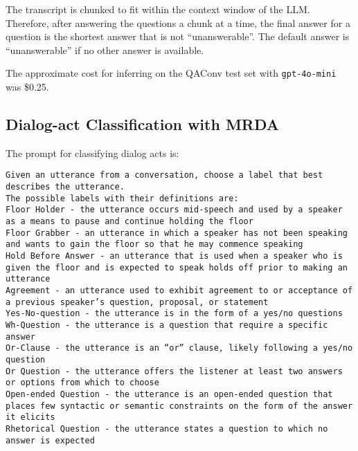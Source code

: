 The transcript is chunked to fit within the context window of the LLM. Therefore, after answering the questions a chunk at a time, the final answer for a question is the shortest answer that is not ``unanswerable''. The default answer is ``unanswerable'' if no other answer is available.

The approximate cost for inferring on the QAConv test set with \texttt{gpt-4o-mini} was \$0.25.


\subsection{Dialog-act Classification with MRDA}
\label{sec_appendix_prompts_mrda}

The prompt for classifying dialog acts is:

\begin{tcolorbox}[colback=gray!10, colframe=gray!50, sharp corners, boxrule=0.5mm]
\small{
\texttt{Given an utterance from a conversation, choose a label that best describes the utterance.\\
The possible labels with their definitions are:\\
Floor Holder - the utterance occurs mid-speech and used by a speaker as a means to pause and continue holding the floor\\
Floor Grabber - an utterance in which a speaker has not been speaking and wants to gain the floor so that he may commence speaking\\
Hold Before Answer - an utterance that is used when a speaker who is given the floor and is expected to speak holds off prior to making an utterance\\
Agreement - an utterance used to exhibit agreement to or acceptance of a previous speaker's question, proposal, or statement\\
Yes-No-question - the utterance is in the form of a yes/no questions\\
Wh-Question - the utterance is a question that require a specific answer\\
Or-Clause - the utterance is an ``or'' clause, likely following a yes/no question\\
Or Question - the utterance offers the listener at least two answers or options from which to choose\\
Open-ended Question - the utterance is an open-ended question that places few syntactic or semantic constraints on the form of the answer it elicits\\
Rhetorical Question - the utterance states a question to which no answer is expected\\
}}
\end{tcolorbox}
